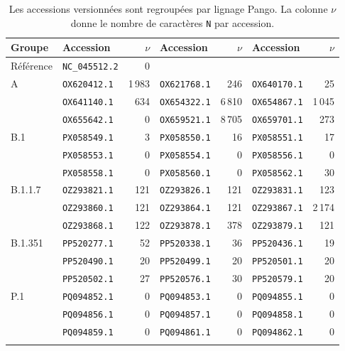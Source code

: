 \begin{table}[htbp]
\centering
\caption{Les accessions versionnées sont regroupées par lignage Pango. La colonne \(\nu\) donne le nombre de caractères \texttt{N} par accession.}\label{tab:accessions}
\small
\begin{tabular}{@{}llr@{\hspace{1.6em}}lr@{\hspace{1.6em}}lr@{}}\toprule
Groupe & Accession & \(\nu\) & Accession & \(\nu\) & Accession & \(\nu\) \\\midrule
Référence & \texttt{NC\_045512.2} & 0 & & & & \\
A & \texttt{OX620412.1} & 1\,983 & \texttt{OX621768.1} & 246 & \texttt{OX640170.1} & 25 \\
 & \texttt{OX641140.1} & 634 & \texttt{OX654322.1} & 6\,810 & \texttt{OX654867.1} & 1\,045 \\
 & \texttt{OX655642.1} & 0 & \texttt{OX659521.1} & 8\,705 & \texttt{OX659701.1} & 273 \\\addlinespace[0.3ex]
B.1 & \texttt{PX058549.1} & 3 & \texttt{PX058550.1} & 16 & \texttt{PX058551.1} & 17 \\
 & \texttt{PX058553.1} & 0 & \texttt{PX058554.1} & 0 & \texttt{PX058556.1} & 0 \\
 & \texttt{PX058558.1} & 0 & \texttt{PX058560.1} & 0 & \texttt{PX058562.1} & 30 \\\addlinespace[0.3ex]
B.1.1.7 & \texttt{OZ293821.1} & 121 & \texttt{OZ293826.1} & 121 & \texttt{OZ293831.1} & 123 \\
 & \texttt{OZ293860.1} & 121 & \texttt{OZ293864.1} & 121 & \texttt{OZ293867.1} & 2\,174 \\
 & \texttt{OZ293868.1} & 122 & \texttt{OZ293878.1} & 378 & \texttt{OZ293879.1} & 121 \\\addlinespace[0.3ex]
B.1.351 & \texttt{PP520277.1} & 52 & \texttt{PP520338.1} & 36 & \texttt{PP520436.1} & 19 \\
 & \texttt{PP520490.1} & 20 & \texttt{PP520499.1} & 20 & \texttt{PP520501.1} & 20 \\
 & \texttt{PP520502.1} & 27 & \texttt{PP520576.1} & 30 & \texttt{PP520579.1} & 20 \\\addlinespace[0.3ex]
P.1 & \texttt{PQ094852.1} & 0 & \texttt{PQ094853.1} & 0 & \texttt{PQ094855.1} & 0 \\
 & \texttt{PQ094856.1} & 0 & \texttt{PQ094857.1} & 0 & \texttt{PQ094858.1} & 0 \\
 & \texttt{PQ094859.1} & 0 & \texttt{PQ094861.1} & 0 & \texttt{PQ094862.1} & 0 \\\addlinespace[0.3ex]

\end{tabular}
\end{table}
